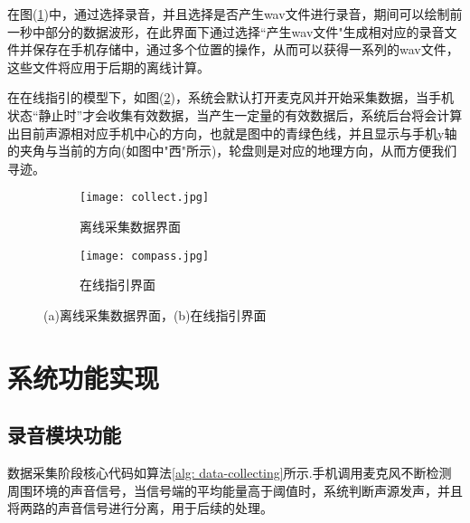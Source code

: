 \documentclass[winfonts]{njuthesis}
\begin{document}
			在图(\ref{fig: UI21})中，通过选择录音，并且选择是否产生wav文件进行录音，期间可以绘制前一秒中部分的数据波形，在此界面下通过选择“产生wav文件"生成相对应的录音文件并保存在手机存储中，通过多个位置的操作，从而可以获得一系列的wav文件，这些文件将应用于后期的离线计算。
			
			在在线指引的模型下，如图(\ref{fig: UI22})，系统会默认打开麦克风并开始采集数据，当手机状态“静止时”才会收集有效数据，当产生一定量的有效数据后，系统后台将会计算出目前声源相对应手机中心的方向，也就是图中的青绿色线，并且显示与手机y轴的夹角与当前的方向(如图中"西"所示)，轮盘则是对应的地理方向，从而方便我们寻迹。
			
			
			\begin{figure}[H]
				\centering
				\begin{subfigure}{.4\textwidth}
					\centering
					\texttt{[image: collect.jpg]}
					\caption{离线采集数据界面}
					\label{fig: UI21}
				\end{subfigure}
				\begin{subfigure}{.4\textwidth}
					\centering
					\texttt{[image: compass.jpg]}
					\caption{在线指引界面}
					\label{fig: UI22}
				\end{subfigure}
				\caption{(a)离线采集数据界面，(b)在线指引界面}
				\label{fig: UI2}
			\end{figure}
			
		
	\section{系统功能实现}
	
		\subsection{录音模块功能}
			数据采集阶段核心代码如算法\ref{alg: data-collecting}所示.手机调用麦克风不断检测周围环境的声音信号，当信号端的平均能量高于阈值时，系统判断声源发声，并且将两路的声音信号进行分离，用于后续的处理。
			
\end{document}
